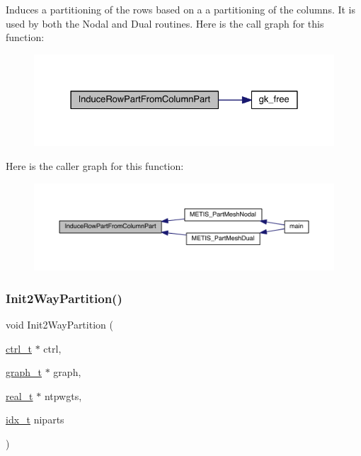 Induces a partitioning of the rows based on a a partitioning of the columns. It is used by both the Nodal and Dual routines. Here is the call graph for this function\+:\nopagebreak
\begin{figure}[H]
\begin{center}
\leavevmode
\includegraphics[width=328pt]{a00945_ae1253bac89c47d556436695e62bcfacd_cgraph}
\end{center}
\end{figure}
Here is the caller graph for this function\+:\nopagebreak
\begin{figure}[H]
\begin{center}
\leavevmode
\includegraphics[width=350pt]{a00945_ae1253bac89c47d556436695e62bcfacd_icgraph}
\end{center}
\end{figure}
\mbox{\label{a00945_af566aa1abb139c5b46b29c95b9ed075d}} 
\subsubsection{\texorpdfstring{Init2\+Way\+Partition()}{Init2WayPartition()}}
{\footnotesize\ttfamily void Init2\+Way\+Partition (\begin{DoxyParamCaption}\item[{\hyperlink{a00742}{ctrl\+\_\+t} $\ast$}]{ctrl,  }\item[{\hyperlink{a00734}{graph\+\_\+t} $\ast$}]{graph,  }\item[{\hyperlink{a00876_a1924a4f6907cc3833213aba1f07fcbe9}{real\+\_\+t} $\ast$}]{ntpwgts,  }\item[{\hyperlink{a00876_aaa5262be3e700770163401acb0150f52}{idx\+\_\+t}}]{niparts }\end{DoxyParamCaption})}

